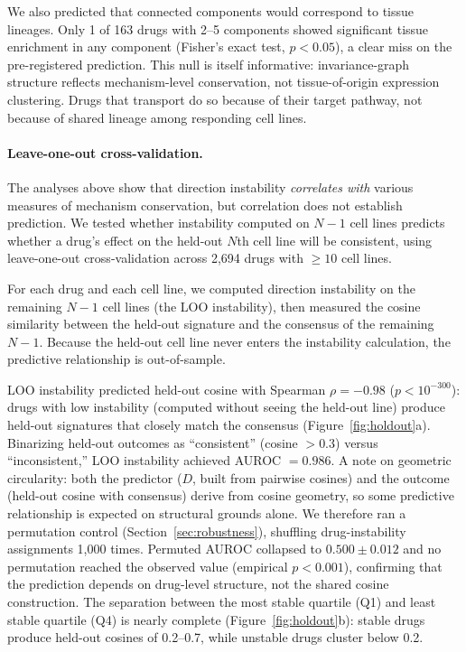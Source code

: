 \documentclass{article}
\begin{document}
We also predicted that connected components would correspond to
tissue lineages. Only 1 of 163 drugs with 2--5 components showed
significant tissue enrichment in any component (Fisher's exact test,
$p < 0.05$), a clear miss on the pre-registered prediction.
This null is itself informative: invariance-graph structure reflects
mechanism-level conservation, not tissue-of-origin expression
clustering. Drugs that transport do so because of their target
pathway, not because of shared lineage among responding cell lines.

\paragraph{Leave-one-out cross-validation.}
\label{sec:holdout}

The analyses above show that direction instability \emph{correlates
with} various measures of mechanism conservation, but correlation does
not establish prediction. We tested whether instability computed on
$N{-}1$ cell lines predicts whether a drug's effect on the held-out
$N$th cell line will be consistent, using leave-one-out cross-validation
across 2{,}694 drugs with $\geq 10$ cell lines.

For each drug and each cell line, we computed direction instability on
the remaining $N{-}1$ cell lines (the LOO instability), then measured
the cosine similarity between the held-out signature and the consensus
of the remaining $N{-}1$. Because the held-out cell line never enters
the instability calculation, the predictive relationship is
out-of-sample.

LOO instability predicted held-out cosine with Spearman $\rho = -0.98$
($p < 10^{-300}$): drugs with low instability (computed without seeing
the held-out line) produce held-out signatures that closely match the
consensus (Figure~\ref{fig:holdout}a). Binarizing held-out outcomes as
``consistent'' (cosine $> 0.3$) versus ``inconsistent,'' LOO instability
achieved AUROC $= 0.986$. A note on geometric circularity: both the
predictor ($D$, built from pairwise cosines) and the outcome (held-out
cosine with consensus) derive from cosine geometry, so some predictive
relationship is expected on structural grounds alone. We therefore ran a
permutation control (Section~\ref{sec:robustness}), shuffling
drug-instability assignments 1{,}000 times. Permuted AUROC collapsed to
$0.500 \pm 0.012$ and no permutation reached the observed value
(empirical $p < 0.001$), confirming that the prediction depends on
drug-level structure, not the shared cosine construction. The separation between the most stable
quartile (Q1) and least stable quartile (Q4) is nearly complete
(Figure~\ref{fig:holdout}b): stable drugs produce held-out cosines of
0.2--0.7, while unstable drugs cluster below 0.2.
\end{document}
